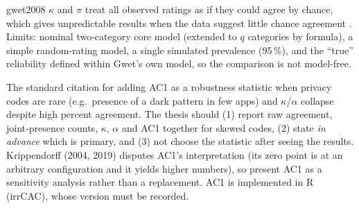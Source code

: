 \begin{papercard}{gwet2008}
 $\kappa$ and $\pi$ treat all observed ratings as if they could agree by chance, which gives unpredictable results when the data suggest little chance agreement . Limits: nominal two-category core model (extended to $q$ categories by formula), a simple random-rating model, a single simulated prevalence (95\,\%), and the ``true'' reliability defined within Gwet's own model, so the comparison is not model-free.

 The standard citation for adding AC1 as a robustness statistic when privacy codes are rare (e.g.\ presence of a dark pattern in few apps) and $\kappa$/$\alpha$ collapse despite high percent agreement. The thesis should (1) report raw agreement, joint-presence counts, $\kappa$, $\alpha$ and AC1 together for skewed codes, (2) state \emph{in advance} which is primary, and (3) not choose the statistic after seeing the results. Krippendorff (2004, 2019) disputes AC1's interpretation (its zero point is at an arbitrary configuration and it yields higher numbers), so present AC1 as a sensitivity analysis rather than a replacement. AC1 is implemented in R (irrCAC), whose version must be recorded.
\end{papercard}
